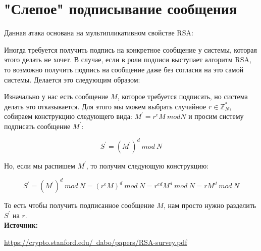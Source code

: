 \documentclass[12pt,a4paper]{scrartcl}
\begin{document}
\section{"Слепое" подписывание сообщения}

Данная атака основана на мультипликативном свойстве RSA:

Иногда требуется получить подпись на конкретное сообщение у системы, которая этого делать не хочет. В случае, если в роли подписи выступает алгоритм RSA,  то возможно получить подпись на сообщение даже без согласия на это самой системы. Делается это следующим образом:

Изначально у нас есть сообщение $M$, которое требуется подписать, но система делать это отказывается. Для этого мы можем выбрать случайное $r \in \mathbb{Z}^*_N$, собираем конструкцию следующего вида: $M^\prime =r^eM\ mod N$ и просим систему подписать сообщение $M^\prime$:

$$S^\prime = (M^\prime)^{d}\ mod\ N$$

Но, если мы распишем $M^\prime$, то получим следующую конструкцию:

$$S^\prime=(M^\prime)^{d}\ mod\ N = (r^eM)^{d}\ mod\ N = r^{ed}M^{d}\ mod\ N = rM^{d}\ mod\ N$$

То есть чтобы получить подписанное сообщение $M$, нам просто нужно разделить $S^\prime$ на $r$.\\

\textbf{Источник:}

\href{https://crypto.stanford.edu/~dabo/papers/RSA-survey.pdf}{https://crypto.stanford.edu/~dabo/papers/RSA-survey.pdf}
\end{document}
